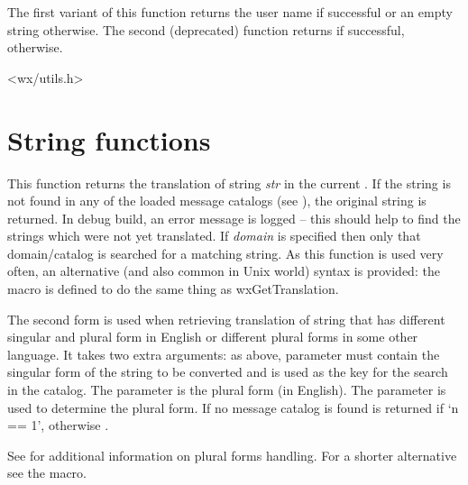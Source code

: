 The first variant of this function returns the user name if successful or an
empty string otherwise. The second (deprecated) function returns \true
if successful, \false otherwise.




<wx/utils.h>



\section{String functions}\label{stringfunctions}

\label{wxgettranslation}



This function returns the translation of string {\it str} in the current
. If the string is not found in any of the loaded
message catalogs (see ), the
original string is returned. In debug build, an error message is logged -- this
should help to find the strings which were not yet translated.  If
{\it domain} is specified then only that domain/catalog is searched
for a matching string.  As this function
is used very often, an alternative (and also common in Unix world) syntax is
provided: the  macro is defined to do the same thing
as wxGetTranslation.

The second form is used when retrieving translation of string that has
different singular and plural form in English or different plural forms in some
other language. It takes two extra arguments: as above, 
parameter must contain the singular form of the string to be converted and
is used as the key for the search in the catalog. The  parameter
is the plural form (in English). The parameter  is used to determine the
plural form.  If no message catalog is found  is returned if `n == 1',
otherwise .

See 
for additional information on plural forms handling. For a shorter alternative
see the  macro.

